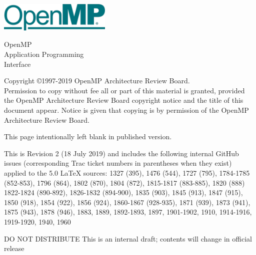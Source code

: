
  \begin{titlepage}
    \begin{flushleft}
     \hspace{-6em} \includegraphics[width=0.4\textwidth]{openmp-logo.png}
    \end{flushleft}

    \begin{adjustwidth}{-0.75in}{0in}
    \begin{center}
      \Huge
      \textsf{OpenMP\\Application Programming\\Interface}

      \vspace{0.5in}\textsf{    }\vspace{-0.7in}
      \normalsize

      \vspace{1.0in}

      \textbf{\ompversion{}}
    \end{center}
    \end{adjustwidth}

    \vspace{3.0in}

\begin{adjustwidth}{0pt}{1em}\setlength{\parskip}{0.25\baselineskip}%
Copyright \copyright 1997-2019 OpenMP Architecture Review Board.\\
Permission to copy without fee all or part of this material is granted,
provided the OpenMP Architecture Review Board copyright notice and
the title of this document appear. Notice is given that copying is by
permission of the OpenMP Architecture Review Board.\end{adjustwidth}

  \end{titlepage}


\clearpage
\thispagestyle{empty}
\phantom{a}
This page intentionally left blank in published version.

This is Revision 2 (18 July 2019) and includes the following internal 
GitHub issues (corresponding Trac ticket numbers in parentheses when
they exist) applied to the 5.0 LaTeX sources: 1327 (395), 1476 (544), 
1727 (795), 1784-1785 (852-853), 1796 (864), 1802 (870), 1804 (872), 
1815-1817 (883-885), 1820 (888) 1822-1824 (890-892), 1826-1832 (894-900), 
1835 (903), 1845 (913), 1847 (915), 1850 (918), 1854 (922), 1856 (924), 
1860-1867 (928-935), 1871 (939), 1873 (941), 1875 (943), 1878 (946), 
1883, 1889, 1892-1893, 1897, 1901-1902, 1910, 1914-1916, 1919-1920, 
1940, 1960

DO NOT DISTRIBUTE
This is an internal draft; contents will change in official release

\vfill

